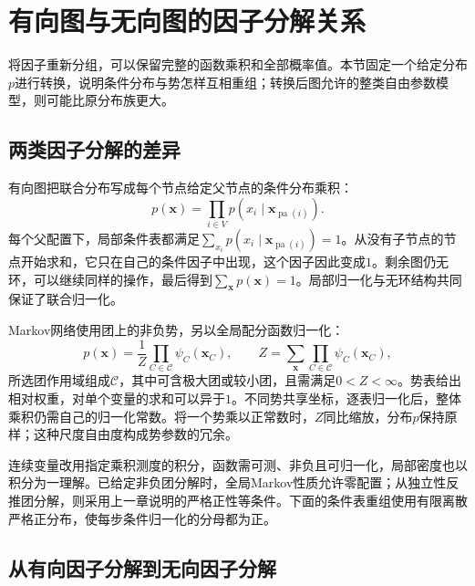 \section{有向图与无向图的因子分解关系}
\label{sec:pgm-representations-factorizations}

将因子重新分组，可以保留完整的函数乘积和全部概率值。本节固定一个给定分布$p$进行转换，说明条件分布与势怎样互相重组；转换后图允许的整类自由参数模型，则可能比原分布族更大。

\subsection{两类因子分解的差异}
\label{sec:pgm-representations-normalization}

有向图把联合分布写成每个节点给定父节点的条件分布乘积：
\begin{equation}
  p(\bm{x})=\prod_{i\in V}
  p(x_i\mid\bm{x}_{\operatorname{pa}(i)}).
  \label{eq:pgm-representations-directed-product}
\end{equation}
每个父配置下，局部条件表都满足$\sum_{x_i}p(x_i\mid\bm{x}_{\operatorname{pa}(i)})=1$。从没有子节点的节点开始求和，它只在自己的条件因子中出现，这个因子因此变成$1$。剩余图仍无环，可以继续同样的操作，最后得到$\sum_{\bm{x}}p(\bm{x})=1$。局部归一化与无环结构共同保证了联合归一化。

Markov网络使用团上的非负势，另以全局配分函数归一化：
\begin{equation}
  p(\bm{x})=\frac{1}{Z}
  \prod_{C\in\mathcal{C}}\psi_C(\bm{x}_C),
  \qquad
  Z=\sum_{\bm{x}}\prod_{C\in\mathcal{C}}\psi_C(\bm{x}_C),
  \label{eq:pgm-representations-undirected-product}
\end{equation}
所选团作用域组成$\mathcal{C}$，其中可含极大团或较小团，且需满足$0<Z<\infty$。势表给出相对权重，对单个变量的求和可以异于$1$。不同势共享坐标，逐表归一化后，整体乘积仍需自己的归一化常数。将一个势乘以正常数时，$Z$同比缩放，分布$p$保持原样；这种尺度自由度构成势参数的冗余。

连续变量改用指定乘积测度的积分，函数需可测、非负且可归一化，局部密度也以积分为一理解。已给定非负团分解时，全局Markov性质允许零配置；从独立性反推团分解，则采用上一章说明的严格正性等条件。下面的条件表重组使用有限离散严格正分布，使每步条件归一化的分母都为正。

\subsection{从有向因子分解到无向因子分解}
\label{sec:pgm-representations-directed-to-undirected}

